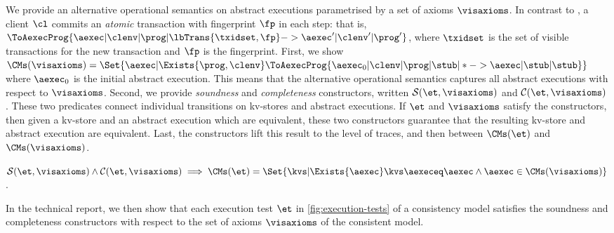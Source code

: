 We provide an alternative operational semantics on abstract executions parametrised by a set of axioms \( \visaxioms \).
In contrast to \cite{sureshConcur}, 
a client \( \cl \) commits an \emph{atomic} transaction with fingerprint \( \fp \) in each step: that is,
\( \ToAexecProg{\aexec | \clenv | \prog | \lbTrans{\txidset,\fp} -> \aexec' | \clenv' | \prog'  }\),
where \( \txidset \) is the set of visible transactions for the new transaction and \( \fp \) is the fingerprint.
First, we show 
\( \CMs(\visaxioms)  = \Set{\aexec | \Exists{\prog,\clenv} \ToAexecProg{\aexec_0 | \clenv | \prog | \stub | * -> \aexec | \stub | \stub  } } \)
where \( \aexec_0 \) is the initial abstract execution.
This means that the alternative operational semantics captures all abstract executions with respect to \( \visaxioms \).
Second, we provide \emph{soundness} and \emph{completeness} constructors,
written \(\mathcal{S}(\et,\visaxioms) \) and \(\mathcal{C}(\et,\visaxioms) \).
These two predicates connect individual transitions on kv-stores and abstract executions.
If \( \et \)  and \( \visaxioms \) satisfy the constructors,
then given a kv-store and an abstract execution which are equivalent,
these two constructors guarantee that the resulting kv-store and abstract execution are equivalent.
Last, the constructors lift this result to the level of traces, and then between \( \CMs(\et)\) and \( \CMs(\visaxioms) \).

\SpaceAboveDef
\begin{theorem}
\( \mathcal{S}(\et,\visaxioms) \land \mathcal{C}(\et,\visaxioms) \implies 
 \CMs(\et) = \Set{\kvs | \Exists{\aexec} \kvs \aexeceq \aexec \land \aexec \in \CMs(\visaxioms)} \).
\end{theorem}
\SpaceBelowDef

\noindent
In the technical report, 
we then show that each execution test \( \et \) in \cref{fig:execution-tests} of a consistency model satisfies
the soundness and completeness constructors
with respect to the set of axioms \( \visaxioms\) of the consistent model.

